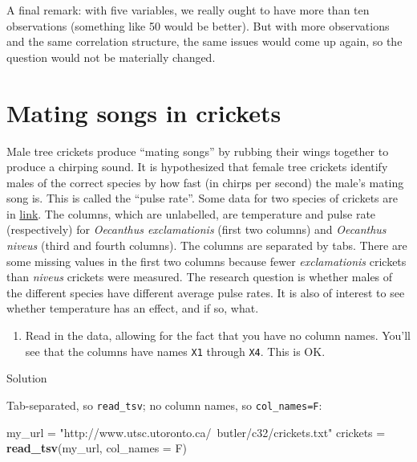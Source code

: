 \documentclass[]{tufte-book}
\newenvironment{Shaded}{}{}
\newcommand{\DataTypeTok}[1]{\textcolor[rgb]{0.56,0.13,0.00}{#1}}
\newcommand{\KeywordTok}[1]{\textcolor[rgb]{0.00,0.44,0.13}{\textbf{#1}}}
\newcommand{\NormalTok}[1]{#1}
\newcommand{\StringTok}[1]{\textcolor[rgb]{0.25,0.44,0.63}{#1}}
\providecommand{\tightlist}{%
  \setlength{\itemsep}{0pt}\setlength{\parskip}{0pt}}
\theoremstyle{definition}
\theoremstyle{definition}
\theoremstyle{definition}
\theoremstyle{remark}
\begin{document}
A final remark: with five variables, we really ought to have more than
ten observations (something like 50 would be better). But with more
observations and the same correlation structure, the same issues would
come up again, so the question would not be materially changed.

\hypertarget{mating-songs-in-crickets}{%
\section{Mating songs in crickets}\label{mating-songs-in-crickets}}

Male tree crickets produce ``mating songs'' by rubbing their wings
together to produce a chirping sound. It is hypothesized that female
tree crickets identify males of the correct species by how fast (in
chirps per second) the male's mating song is. This is called the ``pulse
rate''. Some data for two species of crickets are in
\href{http://www.utsc.utoronto.ca/~butler/c32/crickets.txt}{link}. The
columns, which are unlabelled, are temperature and pulse rate
(respectively) for \emph{Oecanthus exclamationis} (first two columns)
and \emph{Oecanthus niveus} (third and fourth columns). The columns are
separated by tabs. There are some missing values in the first two
columns because fewer \emph{exclamationis} crickets than \emph{niveus}
crickets were measured. The research question is whether males of the
different species have different average pulse rates. It is also of
interest to see whether temperature has an effect, and if so, what.

\begin{enumerate}
\def\labelenumi{(\alph{enumi})}
\tightlist
\item
  Read in the data, allowing for the fact that you have no column names.
  You'll see that the columns have names \texttt{X1} through
  \texttt{X4}. This is OK.
\end{enumerate}

Solution

Tab-separated, so \texttt{read\_tsv}; no column names, so
\texttt{col\_names=F}:

\begin{Shaded}
\begin{Highlighting}[]
\NormalTok{my_url =}\StringTok{ "http://www.utsc.utoronto.ca/~butler/c32/crickets.txt"}
\NormalTok{crickets =}\StringTok{ }\KeywordTok{read_tsv}\NormalTok{(my_url, }\DataTypeTok{col_names =}\NormalTok{ F)}
\end{Highlighting}
\end{Shaded}
\end{document}
